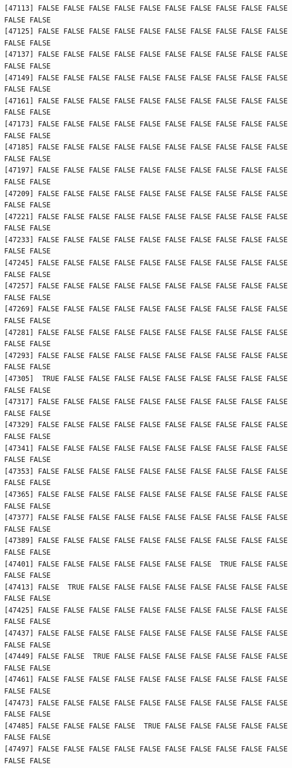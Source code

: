\documentclass[
  a4paper,
  DIV=11,
  numbers=noendperiod]{scrartcl}
\begin{document}
\begin{verbatim}
[47113] FALSE FALSE FALSE FALSE FALSE FALSE FALSE FALSE FALSE FALSE FALSE FALSE
[47125] FALSE FALSE FALSE FALSE FALSE FALSE FALSE FALSE FALSE FALSE FALSE FALSE
[47137] FALSE FALSE FALSE FALSE FALSE FALSE FALSE FALSE FALSE FALSE FALSE FALSE
[47149] FALSE FALSE FALSE FALSE FALSE FALSE FALSE FALSE FALSE FALSE FALSE FALSE
[47161] FALSE FALSE FALSE FALSE FALSE FALSE FALSE FALSE FALSE FALSE FALSE FALSE
[47173] FALSE FALSE FALSE FALSE FALSE FALSE FALSE FALSE FALSE FALSE FALSE FALSE
[47185] FALSE FALSE FALSE FALSE FALSE FALSE FALSE FALSE FALSE FALSE FALSE FALSE
[47197] FALSE FALSE FALSE FALSE FALSE FALSE FALSE FALSE FALSE FALSE FALSE FALSE
[47209] FALSE FALSE FALSE FALSE FALSE FALSE FALSE FALSE FALSE FALSE FALSE FALSE
[47221] FALSE FALSE FALSE FALSE FALSE FALSE FALSE FALSE FALSE FALSE FALSE FALSE
[47233] FALSE FALSE FALSE FALSE FALSE FALSE FALSE FALSE FALSE FALSE FALSE FALSE
[47245] FALSE FALSE FALSE FALSE FALSE FALSE FALSE FALSE FALSE FALSE FALSE FALSE
[47257] FALSE FALSE FALSE FALSE FALSE FALSE FALSE FALSE FALSE FALSE FALSE FALSE
[47269] FALSE FALSE FALSE FALSE FALSE FALSE FALSE FALSE FALSE FALSE FALSE FALSE
[47281] FALSE FALSE FALSE FALSE FALSE FALSE FALSE FALSE FALSE FALSE FALSE FALSE
[47293] FALSE FALSE FALSE FALSE FALSE FALSE FALSE FALSE FALSE FALSE FALSE FALSE
[47305]  TRUE FALSE FALSE FALSE FALSE FALSE FALSE FALSE FALSE FALSE FALSE FALSE
[47317] FALSE FALSE FALSE FALSE FALSE FALSE FALSE FALSE FALSE FALSE FALSE FALSE
[47329] FALSE FALSE FALSE FALSE FALSE FALSE FALSE FALSE FALSE FALSE FALSE FALSE
[47341] FALSE FALSE FALSE FALSE FALSE FALSE FALSE FALSE FALSE FALSE FALSE FALSE
[47353] FALSE FALSE FALSE FALSE FALSE FALSE FALSE FALSE FALSE FALSE FALSE FALSE
[47365] FALSE FALSE FALSE FALSE FALSE FALSE FALSE FALSE FALSE FALSE FALSE FALSE
[47377] FALSE FALSE FALSE FALSE FALSE FALSE FALSE FALSE FALSE FALSE FALSE FALSE
[47389] FALSE FALSE FALSE FALSE FALSE FALSE FALSE FALSE FALSE FALSE FALSE FALSE
[47401] FALSE FALSE FALSE FALSE FALSE FALSE FALSE  TRUE FALSE FALSE FALSE FALSE
[47413] FALSE  TRUE FALSE FALSE FALSE FALSE FALSE FALSE FALSE FALSE FALSE FALSE
[47425] FALSE FALSE FALSE FALSE FALSE FALSE FALSE FALSE FALSE FALSE FALSE FALSE
[47437] FALSE FALSE FALSE FALSE FALSE FALSE FALSE FALSE FALSE FALSE FALSE FALSE
[47449] FALSE FALSE  TRUE FALSE FALSE FALSE FALSE FALSE FALSE FALSE FALSE FALSE
[47461] FALSE FALSE FALSE FALSE FALSE FALSE FALSE FALSE FALSE FALSE FALSE FALSE
[47473] FALSE FALSE FALSE FALSE FALSE FALSE FALSE FALSE FALSE FALSE FALSE FALSE
[47485] FALSE FALSE FALSE FALSE  TRUE FALSE FALSE FALSE FALSE FALSE FALSE FALSE
[47497] FALSE FALSE FALSE FALSE FALSE FALSE FALSE FALSE FALSE FALSE FALSE FALSE

\end{verbatim}
\end{document}
